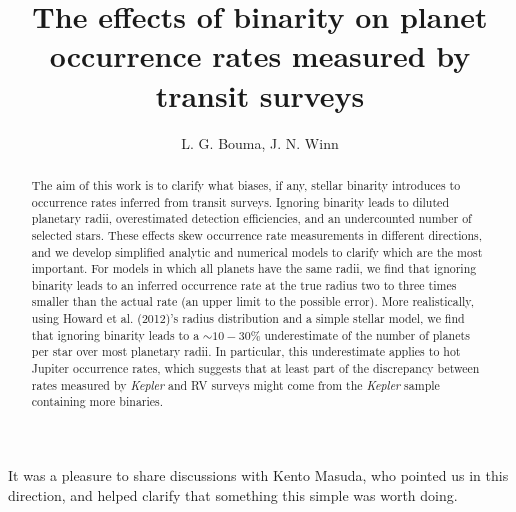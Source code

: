 \documentclass[12pt,modern]{aastex61}
\begin{document}
    
\title{ The effects of binarity on planet occurrence rates measured by transit 
surveys}

\author{
L. G. Bouma, J. N. Winn
}

\begin{abstract}

The aim of this work is to clarify what biases, if any, stellar binarity 
introduces to occurrence rates inferred from transit surveys.
Ignoring binarity leads to diluted planetary radii, overestimated 
detection efficiencies, and an undercounted number of selected stars.
These effects skew occurrence rate measurements in different directions, and 
we develop simplified analytic and numerical models to clarify which are the 
most important.
For models in which all planets have the same radii, we find that 
ignoring binarity leads to an inferred occurrence rate at the true radius two 
to three times smaller than the actual rate (an upper limit to the possible 
error).
More realistically, using Howard et al. (2012)'s radius distribution and a 
simple stellar model, we find that ignoring binarity leads to a $\sim10-30\%$ 
underestimate of the number of planets per star over most planetary radii.
In particular, this underestimate applies to hot Jupiter occurrence rates, 
which suggests that at least part of the discrepancy between rates measured by 
{\it Kepler} and RV surveys might come from the {\it Kepler} sample 
containing more binaries.

\end{abstract}







\acknowledgements
It was a pleasure to share discussions with Kento Masuda, who pointed us in 
this direction, and helped clarify that something this simple was worth doing.


\end{document}
